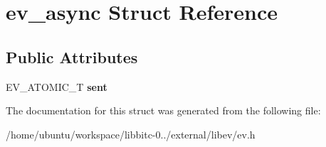 \hypertarget{structev__async}{\section{ev\-\_\-async Struct Reference}
\label{structev__async}
}
\subsection*{Public Attributes}
\begin{DoxyCompactItemize}
\item 
\hypertarget{structev__async_a73b397e2c5756bff1403e9273e6dbaf3}{E\-V\-\_\-\-A\-T\-O\-M\-I\-C\-\_\-\-T {\bfseries sent}}\label{structev__async_a73b397e2c5756bff1403e9273e6dbaf3}

\end{DoxyCompactItemize}


The documentation for this struct was generated from the following file\-:\begin{DoxyCompactItemize}
\item 
/home/ubuntu/workspace/libbitc-\/0../external/libev/ev.\-h\end{DoxyCompactItemize}
